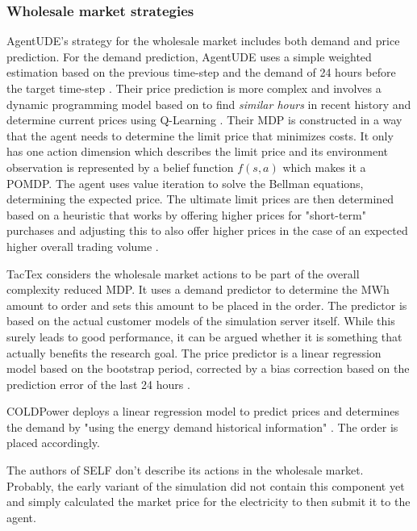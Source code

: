 \subsubsection{Wholesale market strategies}%
\label{ssub:wholesale_market_strategies}


AgentUDE's strategy for the wholesale market includes both demand and price prediction. For the demand prediction, AgentUDE
uses a simple weighted estimation based on the previous time-step and the demand of 24 hours before the target time-step
\citep{ozdemir2015winner}. Their price prediction is more complex and involves a dynamic programming model based on
\citep{tesauro2002strategic} to find \emph{similar hours} in recent history and determine current prices using
Q-Learning \citep{ozdemir2017strategy}. Their \ac{MDP} is constructed in a way that the agent needs to determine the
limit price that minimizes costs. It only has one action dimension which describes the limit price and its environment
observation is represented by a belief function $f(s,a)$ which makes it a \ac{POMDP}. The agent uses value iteration to
solve the Bellman equations, determining the expected price. The ultimate limit prices are then determined based on a
heuristic that works by offering higher prices for "short-term" purchases and adjusting this to also offer higher prices
in the case of an expected higher overall trading volume \citep{ozdemir2017strategy}.

TacTex considers the wholesale market actions to be part of the overall complexity reduced \ac{MDP}. It uses a demand
predictor to determine the \ac{MWh} amount to order and sets this amount to be placed in the order. The
predictor is based on the actual customer models of the simulation server itself. While this surely leads to good
performance, it can be argued whether it is something that actually benefits the research goal. The price predictor is
a linear regression model based on the bootstrap period, corrected by a bias correction based on the prediction error of
the last 24 hours \citep{tactexurieli2016mdp}.

COLDPower deploys a linear regression model to predict prices and determines the demand by "using the energy demand
historical information" \citep{cuevas2015distributed}. The order is placed accordingly.

The authors of \ac{SELF} don't describe its actions in the wholesale market. Probably, the early variant of the
simulation did not contain this component yet and simply calculated the market price for the
electricity to then submit it to the agent.


